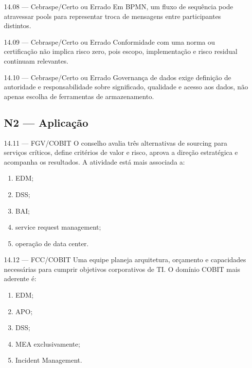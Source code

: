 \begin{questao}{ 14.08 — Cebraspe/Certo ou Errado}
Em BPMN, um fluxo de sequência pode atravessar pools para representar troca de mensagens entre participantes distintos.
\end{questao}

\begin{questao}{ 14.09 — Cebraspe/Certo ou Errado}
Conformidade com uma norma ou certificação não implica risco zero, pois escopo, implementação e risco residual continuam relevantes.
\end{questao}

\begin{questao}{ 14.10 — Cebraspe/Certo ou Errado}
Governança de dados exige definição de autoridade e responsabilidade sobre significado, qualidade e acesso aos dados, não apenas escolha de ferramentas de armazenamento.
\end{questao}

\subsection*{N2 — Aplicação}

\begin{questao}{ 14.11 — FGV/COBIT}
O conselho avalia três alternativas de sourcing para serviços críticos, define critérios de valor e risco, aprova a direção estratégica e acompanha os resultados. A atividade está mais associada a:
\begin{enumerate}[label=\Alph*)]
\item EDM;
\item DSS;
\item BAI;
\item service request management;
\item operação de data center.
\end{enumerate}
\end{questao}

\begin{questao}{ 14.12 — FCC/COBIT}
Uma equipe planeja arquitetura, orçamento e capacidades necessárias para cumprir objetivos corporativos de TI. O domínio COBIT mais aderente é:
\begin{enumerate}[label=\Alph*)]
\item EDM;
\item APO;
\item DSS;
\item MEA exclusivamente;
\item Incident Management.
\end{enumerate}
\end{questao}

